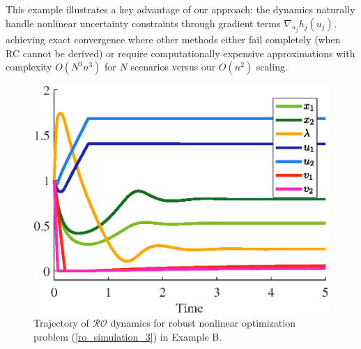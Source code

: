 \documentclass[journal,twoside,web]{ieeecolor}
\newcommand{\rev}[1]{\textcolor{revisionblue}{#1}}
\begin{document}
\rev{This example illustrates a key advantage of our approach: the dynamics naturally handle nonlinear uncertainty constraints through gradient terms $\nabla_{u_j} h_j(u_j)$, achieving exact convergence where other methods either fail completely (when RC cannot be derived) or require computationally expensive approximations with complexity $O(N^3n^3)$ for $N$ scenarios versus our $O(n^2)$ scaling.}
\begin{figure}
\begin{center}
\includegraphics[scale=0.55]{trajectories_nonlinear_exp_no_RC.eps}
\caption{\rev{Trajectory of $\mathcal{RO}$ dynamics for robust nonlinear optimization problem (\ref{ro_simulation_3}) in Example B.}}
\label{trajectories_nonlinear_exp_no_RC}
\end{center}
\end{figure}
\end{document}
